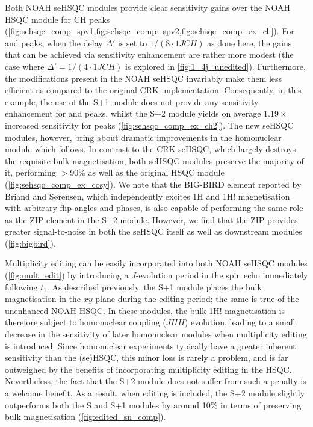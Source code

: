 \documentclass[11pt]{article}
\newcommand*{\noahS}{S}
\newcommand*{\noahSpa}{S+1}
\newcommand*{\noahSpb}{S+2}
\newcommand*{\onejch}{1JCH}
\newcommand*{\magn}[1]{1H#1}
\newcommand*{\magnnot}[1]{1H!#1}
\newcommand*{\jhh}{JHH}
\begin{document}
\begin{refsection}
Both NOAH seHSQC modules provide clear sensitivity gains over the NOAH HSQC module for CH peaks (\cref{fig:sehsqc_comp_spv1,fig:sehsqc_comp_spv2,fig:sehsqc_comp_ex_ch}).
For  and  peaks, when the delay $\Delta'$ is set to $1/(8 \cdot \onejch)$ as done here, the gains that can be achieved via sensitivity enhancement are rather more modest (the case where $\Delta' = 1/(4\cdot\onejch)$ is explored in \cref{fig:1_4j_unedited}).\autocite{Schleucher1994JBNMR}
Furthermore, the modifications present in the NOAH seHSQC invariably make them less efficient as compared to the original CRK implementation.
Consequently, in this example, the use of the \noahSpa{} module does not provide any sensitivity enhancement for  and  peaks, whilst the \noahSpb{} module yields on average $1.19\times$ increased sensitivity for  peaks (\cref{fig:sehsqc_comp_ex_ch2}).
The new seHSQC modules, however, bring about dramatic improvements in the homonuclear module which follows.
In contrast to the CRK seHSQC, which largely destroys the requisite bulk magnetisation, both seHSQC modules preserve the majority of it, performing $>$90\% as well as the original HSQC module (\cref{fig:sehsqc_comp_ex_cosy}).
We note that the BIG-BIRD element reported by Briand and S{\o}rensen\autocite{Briand1997JMR}, which independently excites \magn{} and \magnnot{} magnetisation with arbitrary flip angles and phases, is also capable of performing the same role as the ZIP element in the \noahSpb{} module.
However, we find that the ZIP provides greater signal-to-noise in both the seHSQC itself as well as downstream modules (\cref{fig:bigbird}).

Multiplicity editing\autocite{Parella1997JMR} can be easily incorporated into both NOAH seHSQC modules (\cref{fig:mult_edit}) by introducing a $J$-evolution period in the spin echo immediately following $t_1$.
As described previously, the \noahSpa{} module places the bulk magnetisation in the $xy$-plane during the editing period; the same is true of the unenhanced NOAH HSQC.
In these modules, the bulk \magnnot{} magnetisation is therefore subject to homonuclear coupling ($\jhh$) evolution, leading to a small decrease in the sensitivity of later homonuclear modules when multiplicity editing is introduced.
Since homonuclear experiments typically have a greater inherent sensitivity than the (se)HSQC, this minor loss is rarely a problem, and is far outweighed by the benefits of incorporating multiplicity editing in the HSQC.
Nevertheless, the fact that the \noahSpb{} module does not suffer from such a penalty is a welcome benefit.
As a result, when editing is included, the \noahSpb{} module slightly outperforms both the \noahS{} and \noahSpa{} modules by around 10\% in terms of preserving bulk magnetisation (\cref{fig:edited_sn_comp}).


\end{refsection}
\end{document}
